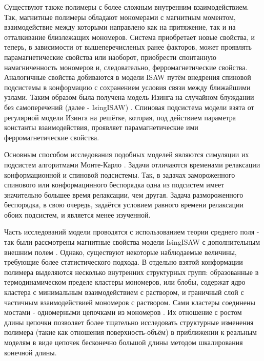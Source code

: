 
Существуют также полимеры с более сложным внутренним взаимодействием.
Так, магнитные полимеры обладают мономерами с магнитным моментом, взаимодействие между которыми
направлено как на притяжение,
так и на отталкивание близлежащих мономеров.
Система приобретает новые свойства, и теперь, в зависимости от вышеперечисленых ранее факторов, может проявлять парамагнетические свойства или наоборот, приобрести спонтанную намагниченность мономеров и, следовательно, ферромагнетические свойства.  
Аналогичные свойства добиваются в модели ISAW путём внедрения спиновой подсистемы в конформацию 
с сохранением условия связи между ближайшими узлами.
Таким образом была получена модель Изинга на случайном блуждании без самоперечений (далее - IsingISAW) \cite{Aerstens1992}.
Спиновая подсистема модели взята от регулярной модели Изинга на решётке, которая, под действием параметра константы взаимодействия, проявляет парамагнетические ими ферромагнетические свойства.

Основным способом исследования подобных моделей являются симуляции их подсистем алгоритмами Монте-Карло \cite{Worm, Wolff, madras1988pivot}.
Задачи отличаются временами релаксации конформационной и спиновой подсистемы.
Так, в задачах замороженного спинового или конформацинного беспорядка одна из подсистем имеет значительно большее время релаксации, чем другая.
Задача размороженного беспорядка, в свою очередь, задаётся условием равного времени релаксации обоих подсистем, и является менее изученной.

Часть исследований модели проводятся с использованием теории среднего поля - так были рассмотрены магнитные свойства модели IsingISAW с дополнительным внешним полем \cite{Garel1999}. 
Однако, существуют некоторые наблюдаемые величины, требующие более статистического подхода.
В отдельно взятой конформации полимера выделяются несколько внутренних структурных групп:
образованные в термодинамическом пределе кластеры мономеров, или блобы, содержат ядро кластера с минимальным взаимодействием с раствором, и граничный слой с частичным взаимодействией мономеров с раствором. 
Сами кластеры соединены мостами - одномерными цепочками из мономеров \cite{Gennes1979}.
Их отношение с ростом длины цепочки позволяет более тщательно исследовать структурные изменения полимера (такие как отношения поверхность-объём) в приближении к реальным моделям в виде цепочек бесконечно большой длины методом шкалирования конечной длины.

